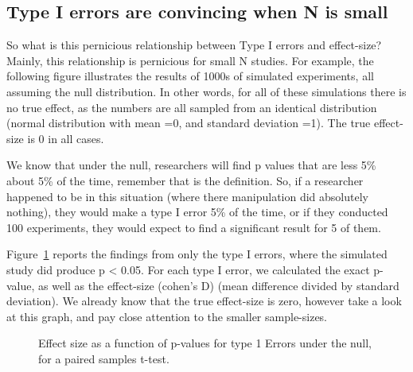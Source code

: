\documentclass[
  letterpaper,
  DIV=11,
  numbers=noendperiod]{scrreprt}
\begin{document}
\subsection{Type I errors are convincing when N is
small}\label{type-i-errors-are-convincing-when-n-is-small-1}

So what is this pernicious relationship between Type I errors and
effect-size? Mainly, this relationship is pernicious for small N
studies. For example, the following figure illustrates the results of
1000s of simulated experiments, all assuming the null distribution. In
other words, for all of these simulations there is no true effect, as
the numbers are all sampled from an identical distribution (normal
distribution with mean =0, and standard deviation =1). The true
effect-size is 0 in all cases.

We know that under the null, researchers will find p values that are
less 5\% about 5\% of the time, remember that is the definition. So, if
a researcher happened to be in this situation (where there manipulation
did absolutely nothing), they would make a type I error 5\% of the time,
or if they conducted 100 experiments, they would expect to find a
significant result for 5 of them.

Figure~\ref{fig-13effectsizeType1} reports the findings from only the
type I errors, where the simulated study did produce p \textless{} 0.05.
For each type I error, we calculated the exact p-value, as well as the
effect-size (cohen's D) (mean difference divided by standard deviation).
We already know that the true effect-size is zero, however take a look
at this graph, and pay close attention to the smaller sample-sizes.

\begin{figure}


\caption{\label{fig-13effectsizeType1}Effect size as a function of
p-values for type 1 Errors under the null, for a paired samples t-test.}

\end{figure}%
\end{document}
